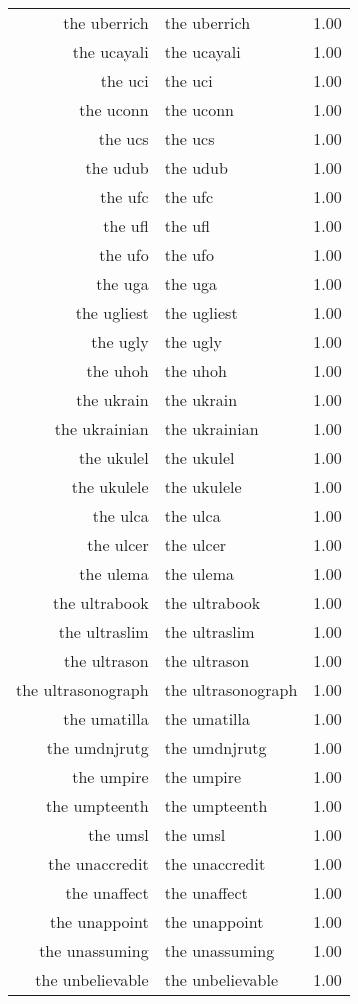\begin{table}[ht]
\begin{tabular}{rlr}
  the uberrich & the uberrich & 1.00 \\ 
  the ucayali & the ucayali & 1.00 \\ 
  the uci & the uci & 1.00 \\ 
  the uconn & the uconn & 1.00 \\ 
  the ucs & the ucs & 1.00 \\ 
  the udub & the udub & 1.00 \\ 
  the ufc & the ufc & 1.00 \\ 
  the ufl & the ufl & 1.00 \\ 
  the ufo & the ufo & 1.00 \\ 
  the uga & the uga & 1.00 \\ 
  the ugliest & the ugliest & 1.00 \\ 
  the ugly & the ugly & 1.00 \\ 
  the uhoh & the uhoh & 1.00 \\ 
  the ukrain & the ukrain & 1.00 \\ 
  the ukrainian & the ukrainian & 1.00 \\ 
  the ukulel & the ukulel & 1.00 \\ 
  the ukulele & the ukulele & 1.00 \\ 
  the ulca & the ulca & 1.00 \\ 
  the ulcer & the ulcer & 1.00 \\ 
  the ulema & the ulema & 1.00 \\ 
  the ultrabook & the ultrabook & 1.00 \\ 
  the ultraslim & the ultraslim & 1.00 \\ 
  the ultrason & the ultrason & 1.00 \\ 
  the ultrasonograph & the ultrasonograph & 1.00 \\ 
  the umatilla & the umatilla & 1.00 \\ 
  the umdnjrutg & the umdnjrutg & 1.00 \\ 
  the umpire & the umpire & 1.00 \\ 
  the umpteenth & the umpteenth & 1.00 \\ 
  the umsl & the umsl & 1.00 \\ 
  the unaccredit & the unaccredit & 1.00 \\ 
  the unaffect & the unaffect & 1.00 \\ 
  the unappoint & the unappoint & 1.00 \\ 
  the unassuming & the unassuming & 1.00 \\ 
  the unbelievable & the unbelievable & 1.00 \\ 

\end{tabular}
\end{table}
